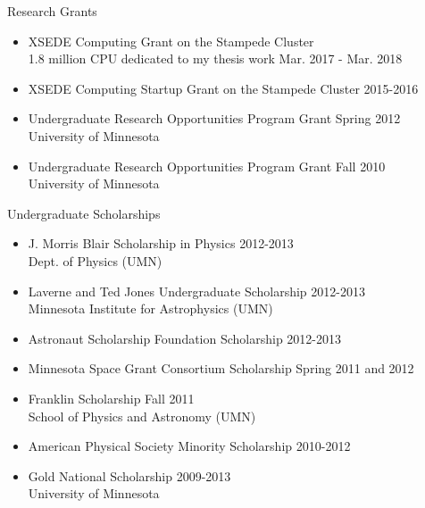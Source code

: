 \documentclass[10pt]{article}
\renewcommand{\section}[1]{\pagebreak[3]%
    \hyphenpenalty=10000%
    \vspace{1.3\baselineskip}%
    \phantomsection\addcontentsline{toc}{section}{#1}%
    \noindent\llap{\scshape\smash{\parbox[t]{\marginparwidth}{\raggedright #1}}}%
    \vspace{-\baselineskip}\par}
\newenvironment{innerlist}[1][\enskip\textbullet]%
        {\begin{itemize}[#1,leftmargin=*,parsep=0pt,itemsep=0pt,topsep=0pt,partopsep=0pt]}
        {\end{itemize}}
\newcommand{\halfblankline}{\quad\vspace{-0.5\baselineskip}\pagebreak[3]}
\begin{document}
Research Grants
\begin{innerlist}
\item XSEDE Computing Grant on the Stampede Cluster \\ 
     1.8 million CPU dedicated to my thesis work \hfill Mar. 2017 - Mar. 2018 \\
\item XSEDE Computing Startup Grant on the Stampede Cluster \hfill 2015-2016 \\
\item Undergraduate Research Opportunities Program Grant \hfill Spring 2012 \\
University of Minnesota
\item Undergraduate Research Opportunities Program Grant \hfill Fall 2010 \\
University of Minnesota 
\end{innerlist}

\halfblankline
\iflong
Undergraduate Scholarships
\begin{innerlist}
\item J. Morris Blair Scholarship in Physics \hfill 2012-2013\\
Dept. of Physics (UMN)
\item Laverne and Ted Jones Undergraduate Scholarship \hfill 2012-2013 \\
Minnesota Institute for Astrophysics (UMN) 
\item Astronaut Scholarship Foundation Scholarship \hfill 2012-2013
\item Minnesota Space Grant Consortium Scholarship \hfill Spring 2011 and 2012
\item Franklin Scholarship \hfill Fall 2011\\
School of Physics and Astronomy (UMN)
\item American Physical Society Minority Scholarship \hfill 2010-2012
\item Gold National Scholarship \hfill 2009-2013\\
University of Minnesota
\end{innerlist}
\fi



\end{document}
